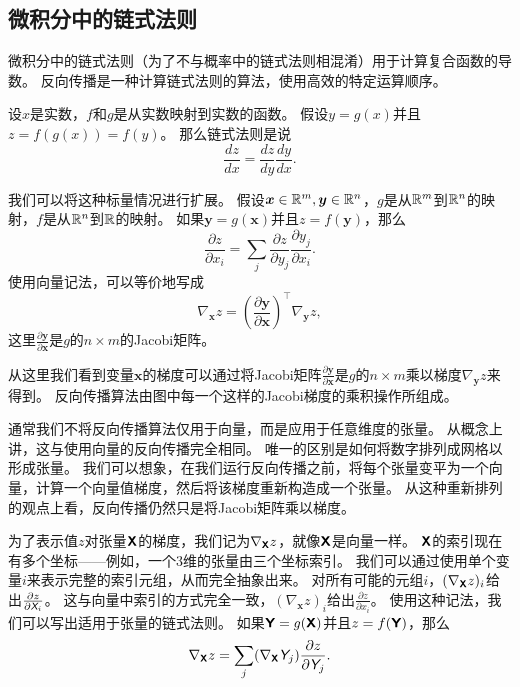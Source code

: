 \subsection{微积分中的链式法则}
\label{sec:chain_rule_of_calculus}

微积分中的链式法则（为了不与概率中的链式法则相混淆）用于计算复合函数的导数。
反向传播是一种计算链式法则的算法，使用高效的特定运算顺序。

设$x$是实数，$f$和$g$是从实数映射到实数的函数。
假设$y=g(x)$并且$z=f(g(x))=f(y)$。
那么链式法则是说
\begin{equation}
\frac{dz}{dx}=\frac{dz}{dy} \frac{dy}{dx}.
\end{equation}

我们可以将这种标量情况进行扩展。
假设$\bm{x}\in \mathbb{R}^m, \bm{y}\in \mathbb{R}^n$，$g$是从$\mathbb{R}^m$到$\mathbb{R}^n$的映射，$f$是从$\mathbb{R}^n$到$\mathbb{R}$的映射。
如果$\bm{y}=g(\bm{x})$并且$z=f(\bm{y})$，那么
\begin{equation}
\frac{\partial z}{\partial x_i} = \sum_j \frac{\partial z}{\partial y_j} \frac{\partial y_j}{\partial x_i}.
\end{equation}
使用向量记法，可以等价地写成
\begin{equation}
\nabla_{\bm{x}}z = \left ( \frac{\partial \bm{y}}{\partial \bm{x}} \right )^\top \nabla_{\bm{y}} z,
\end{equation}
这里$\frac{\partial \bm{y}}{\partial \bm{x}}$是$g$的$n\times m$的Jacobi矩阵。

从这里我们看到变量$\bm{x}$的梯度可以通过将Jacobi矩阵$\frac{\partial \bm{y}}{\partial \bm{x}}$是$g$的$n\times m$乘以梯度$\nabla_{\bm{y}} z$来得到。
反向传播算法由图中每一个这样的Jacobi梯度的乘积操作所组成。


通常我们不将反向传播算法仅用于向量，而是应用于任意维度的张量。
从概念上讲，这与使用向量的反向传播完全相同。 
唯一的区别是如何将数字排列成网格以形成张量。 
我们可以想象，在我们运行反向传播之前，将每个张量变平为一个向量，计算一个向量值梯度，然后将该梯度重新构造成一个张量。
从这种重新排列的观点上看，反向传播仍然只是将Jacobi矩阵乘以梯度。


为了表示值$z$对张量$\textsf{\textbf{X}}$的梯度，我们记为$\nabla_{\textsf{\textbf{X}}} z$，就像$\textsf{\textbf{X}}$是向量一样。
$\textsf{\textbf{X}}$的索引现在有多个坐标——例如，一个3维的张量由三个坐标索引。
我们可以通过使用单个变量$i$来表示完整的索引元组，从而完全抽象出来。
对所有可能的元组$i$，$(\nabla_{\textsf{\textbf{X}}} z)_i$给出$\frac{\partial z}{\partial \textit{\textsf{X}}_i}$。
这与向量中索引的方式完全一致，$(\nabla_{\bm{x}} z)_i$给出$\frac{\partial z}{\partial x_i}$。
使用这种记法，我们可以写出适用于张量的链式法则。
如果$\textsf{\textbf{Y}}=g(\textsf{\textbf{X}})$并且$z=f(\textsf{\textbf{Y}})$，那么
\begin{equation}
  \nabla_{\textsf{\textbf{X}}} z = \sum_j (\nabla_{\textsf{\textbf{X}}} \textit{\textsf{Y}}_j)\frac{\partial z}{\partial \textit{\textsf{Y}}_j}.
  \label{eq:6.47}
\end{equation}

